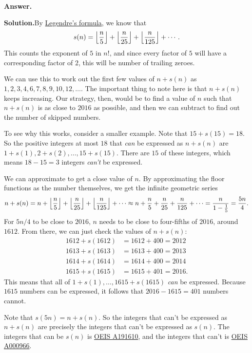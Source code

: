 \documentclass[11pt,paper=letter]{scrartcl}
\newcommand{\ans}{{\sffamily \bfseries Answer.}\;}
\newcommand{\sol}{{\sffamily \bfseries Solution.}\;}
\newenvironment{rem}%
{\noindent \ignorespaces \small \sffamily \sansmath {\bfseries Remark.}}%
{\ignorespacesafterend}
\begin{document}
\begin{enumerate}[left=0pt]
\ans{$401$}

\sol By \href{https://en.wikipedia.org/wiki/Legendre%27s_formula}{Legendre's formula}, we know that \[
  s(n) = \left\lfloor \frac{n}{5} \right\rfloor + \left\lfloor \frac{n}{25} \right\rfloor + \left\lfloor \frac{n}{125} \right\rfloor + \cdots.
\]
This counts the exponent of $5$ in $n!$, and since every factor of $5$ will have a corresponding factor of $2$, this will be number of trailing zeroes.

We can use this to work out the first few values of $n + s(n)$ as $1, 2, 3, 4, 6, 7, 8, 9, 10, 12, \ldots$. The important thing to note here is that $n + s(n)$ keeps increasing. Our strategy, then, would be to find a value of $n$ such that $n + s(n)$ is as close to $2016$ as possible, and then we can subtract to find out the number of skipped numbers.

To see why this works, consider a smaller example. Note that $15 + s(15) = 18$. So the positive integers at most $18$ that \textit{can} be expressed as $n + s(n)$ are $1 + s(1), 2 + s(2), \ldots, 15 + s(15)$. There are $15$ of these integers, which means $18 - 15 = 3$ integers \textit{can't} be expressed.

We can approximate to get a close value of $n$. By approximating the floor functions as the number themselves, we get the infinite geometric series \[
  n + s(n) = n + \left\lfloor \frac{n}{5} \right\rfloor + \left\lfloor \frac{n}{25} \right\rfloor + \left\lfloor \frac{n}{125} \right\rfloor + \cdots
  \approx n + {\frac{n}{5}} + {\frac{n}{25}} + {\frac{n}{125}} + \cdots = \frac{n}{1 - \frac{1}{5}} = \frac{5n}{4}.
\]
For $5n/4$ to be close to $2016$, $n$ needs to be close to four-fifths of $2016$, around $1612$. From there, we can just check the values of $n + s(n)$:
\begin{align*}
1612 + s(1612) &= 1612 + 400 = 2012 \\
1613 + s(1613) &= 1613 + 400 = 2013 \\
1614 + s(1614) &= 1614 + 400 = 2014 \\
1615 + s(1615) &= 1615 + 401 = 2016.
\end{align*}
This means that all of $1 + s(1), \ldots, 1615 + s(1615)$ \textit{can} be expressed. Because $1615$ numbers can be expressed, it follows that $2016 - 1615 = 401$ numbers cannot.

\begin{rem}
Note that $s(5n) = n + s(n)$. So the integers that can't be expressed as $n + s(n)$ are precisely the integers that can't be expressed as $s(n)$. The integers that can be $s(n)$ is \href{http://oeis.org/A191610}{OEIS A191610}, and the integers that can't is \href{http://oeis.org/A000966}{OEIS A000966}.
\end{rem}

\end{enumerate}

\end{document}
